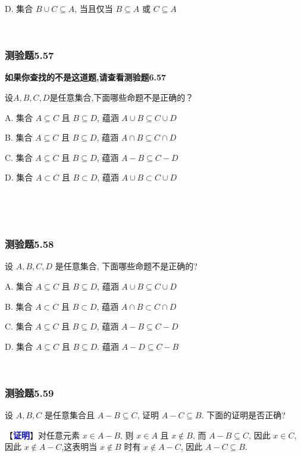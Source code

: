 \documentclass[UTF8, heading=true]{ctexart}
\begin{document}
D. 集合 $B \cup C \subseteq A$, 当且仅当 $B \subseteq A$ 或 $C \subseteq A$

\textcolor{white}{答案：B}



\subsubsection{测验题5.57}

\textbf{如果你查找的不是这道题,请查看测验题6.57}

设$A, B, C, D$是任意集合,下面哪些命题不是正确的？

A. 集合 $A \subseteq C$ 且 $B \subseteq D$, 蕴涵 $A \cup B \subseteq C \cup D$

B. 集合 $A \subseteq C$ 且 $B \subseteq D$, 蕴涵 $A \cap B \subseteq C \cap D$

C. 集合 $A \subseteq C$ 且 $B \subseteq D$, 蕴涵 $A-B \subseteq C-D$

D. 集合 $A \subset C$ 且 $B \subset D$, 蕴涵 $A \cup B \subset C \cup D$


\textcolor{white}{答案：CD}

\textcolor{white}{解析：D选项反例：$A=\{1\},B=\{2\},C=D=\{1,2\}$.}

\subsubsection{测验题5.58}
设 $A, B, C, D$ 是任意集合, 下面哪些命题不是正确的?

A. 
集合 $A \subseteq C$ 且 $B \subseteq D$, 蕴涵 $A \cup B \subseteq C \cup D$

B. 
集合 $A \subset C$ 且 $B \subset D$, 蕴涵 $A \cap B \subset C \cap D$

C. 
集合 $A \subseteq C$ 且 $B \subseteq D$, 蕴涵 $A-B \subseteq C-D$

D. 
集合 $A \subseteq C$ 且 $B \subseteq D$. 蕴涵 $A-D \subseteq C-B$

\textcolor{white}{答案：BC}

\subsubsection{测验题5.59}

设 $A, B, C$ 是任意集合且 $A-B \subseteq C$, 证明 $A-C \subseteq B$. 下面的证明是否正确?

【\textcolor{blue}{\textbf{证明}}】对任意元素 $x \in A-B$, 则 $x \in A$ 且 $x \notin B$, 而 $A-B \subseteq C$, 因此 $x \in C$, 因此 $x \notin A-C$,这表明当 $x \notin B$ 时有 $x \notin A-C$, 因此 $A-C \subseteq B$.
\end{document}

